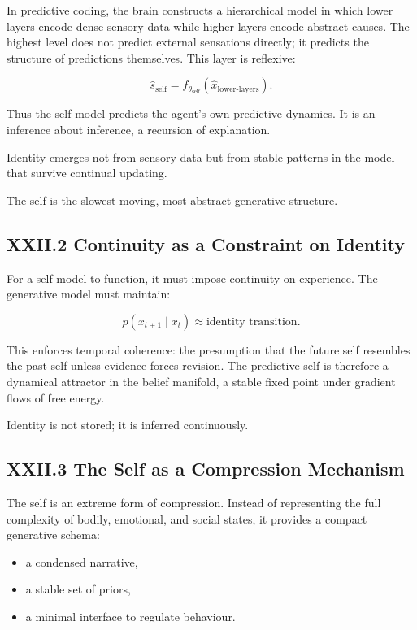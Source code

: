 \documentclass[11pt,letterpaper]{article}
\begin{document}
In predictive coding, the brain constructs a hierarchical model in which lower layers encode dense sensory data while higher layers encode abstract causes. The highest level does not predict external sensations directly; it predicts the structure of predictions themselves. This layer is reflexive:

\[
\hat{s}_{\text{self}} = f_{\theta_{\text{self}}}(\hat{x}_{\text{lower-layers}}).
\]

Thus the self-model predicts the agent's own predictive dynamics. It is an inference about inference, a recursion of explanation.

Identity emerges not from sensory data but from stable patterns in the model that survive continual updating.

The self is the slowest-moving, most abstract generative structure.

\subsection{XXII.2 Continuity as a Constraint on Identity}

For a self-model to function, it must impose continuity on experience.  
The generative model must maintain:

\[
p(x_{t+1} \mid x_t) \approx \text{identity transition}.
\]

This enforces temporal coherence: the presumption that the future self resembles the past self unless evidence forces revision. The predictive self is therefore a dynamical attractor in the belief manifold, a stable fixed point under gradient flows of free energy.

Identity is not stored; it is inferred continuously.

\subsection{XXII.3 The Self as a Compression Mechanism}

The self is an extreme form of compression. Instead of representing the full complexity of bodily, emotional, and social states, it provides a compact generative schema:

\begin{itemize}
    \item a condensed narrative,
    \item a stable set of priors,
    \item a minimal interface to regulate behaviour.
\end{itemize}
\end{document}
